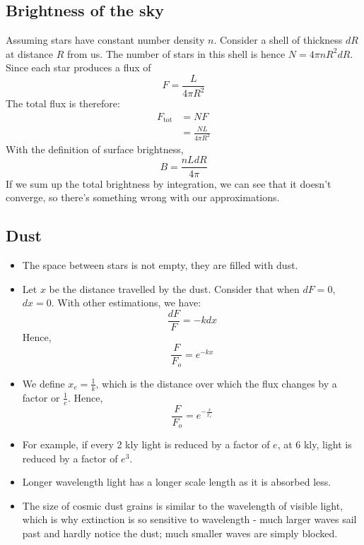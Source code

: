 \documentclass{article}
\begin{document}
\subsection{Brightness of the sky}
Assuming stars have constant number density $n$. Consider a shell of thickness $dR$ at distance $R$ from us. The number of stars in this shell is hence $N= 4\pi n  R^2 dR$. Since each star produces a flux of  
\begin{equation}
F=\frac{L}{4\pi R^2}
\end{equation}
The total flux is therefore:
\begin{align}
F_\text{tot}&=NF\\
&=\frac{NL}{4\pi R^2}
\end{align}
With the definition of surface brightness, 
\begin{equation}
B=\frac{nLdR}{4 \pi}
\end{equation}
If we sum up the total brightness by integration, we can see that it doesn't converge, so there's something wrong with our approximations.
\subsection{Dust}
\begin{itemize}
\item The space between stars is not empty, they are filled with dust.
\item Let $x$ be the distance travelled by the dust. Consider that when $dF=0$, $dx=0$. With other estimations, we have:
\begin{equation}
\frac{dF}{F}=-kdx
\end{equation}
Hence,
\begin{equation}
\frac{F}{F_o}=e^{-kx}
\end{equation}
\item We define $x_e=\frac{1}{k}$, which is the distance over which the flux changes by a factor or $\frac{1}{e}$.
Hence, 
\begin{equation}
\frac{F}{F_o}=e^{-\frac{x}{x_e}}
\end{equation}

\item For example, if every 2 kly light is reduced by a factor of $e$, at 6 kly, light is reduced by a factor of $e^3$.
\item Longer wavelength light has a longer scale length as it is absorbed less.
\item The size of cosmic dust grains is similar to the wavelength of visible light, which is why extinction is so sensitive to wavelength - much larger waves sail past and hardly notice
the dust; much smaller waves are simply blocked.
\end{itemize}
\end{document}

